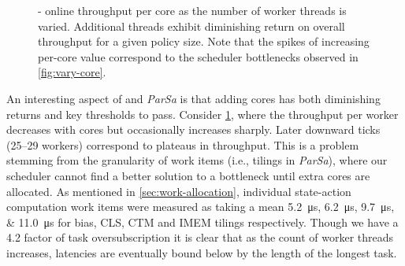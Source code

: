 \begin{figure}
	\caption[\approachshort{}-\coopfw{}'s online throughput per core as the number of worker threads is varied.]{\approachshort{}-\coopfw{} online throughput per core as the number of worker threads is varied. Additional threads exhibit diminishing return on overall throughput for a given policy size. Note that the spikes of increasing per-core value correspond to the scheduler bottlenecks observed in \cref{fig:vary-core}.\label{fig:tput-per-core}}
\end{figure}

An interesting aspect of \Coopfw{} and \emph{ParSa} is that adding cores has both diminishing returns and key thresholds to pass.
Consider \cref{fig:tput-per-core}, where the throughput per worker decreases with cores but occasionally increases sharply.
Later downward ticks (\numrange{25}{29} workers) correspond to plateaus in throughput.
This is a problem stemming from the granularity of work items (i.e., tilings in \emph{ParSa}), where our scheduler cannot find a better solution to a bottleneck until extra cores are allocated.
As mentioned in \cref{sec:work-allocation}, individual state-action computation work items were measured as taking a mean \qtylist{5.2; 6.2; 9.7; 11.0}{\micro\second} for bias, CLS, CTM and IMEM tilings respectively.
Though we have a \qty{4.2}{\times} factor of task oversubscription it is clear that as the count of worker threads increases, latencies are eventually bound below by the length of the longest task.

